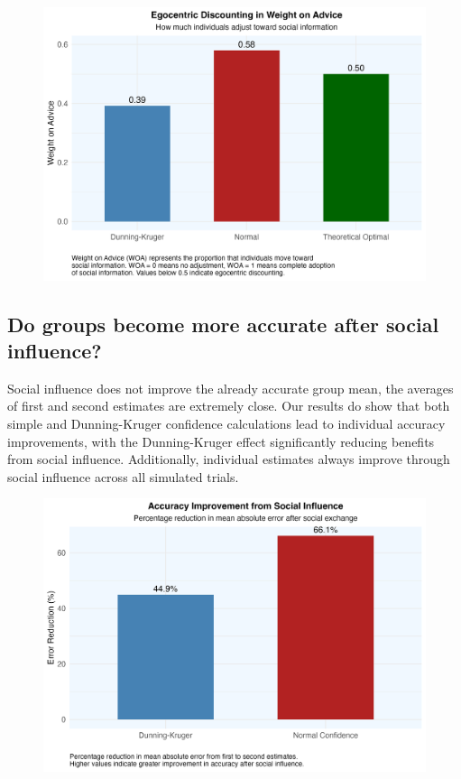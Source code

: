 \documentclass[
  man,floatsintext]{apa6}
\begin{document}
\begin{figure}[H]
\includegraphics[width=7in]{photos/weight_on_advice} \caption{ }\label{fig:unnamed-chunk-5}
\end{figure}

\hypertarget{do-groups-become-more-accurate-after-social-influence}{%
\subsection{Do groups become more accurate after social influence?}\label{do-groups-become-more-accurate-after-social-influence}}

Social influence does not improve the already accurate group mean, the averages of first and second estimates are extremely close. Our results do show that both simple and Dunning-Kruger confidence calculations lead to individual accuracy improvements, with the Dunning-Kruger effect significantly reducing benefits from social influence. Additionally, individual estimates always improve through social influence across all simulated trials.

\begin{figure}[H]
\includegraphics[width=7in]{photos/accuracy_improvement} \caption{ }\label{fig:unnamed-chunk-6}
\end{figure}
\end{document}
